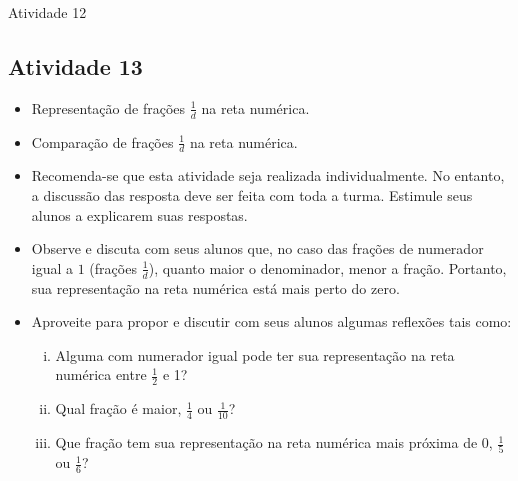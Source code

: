 \begin{multicols}{2}
\begin{resposta*}{Atividade 12}


\end{resposta*}


\subsection{Atividade 13}


  \begin{itemize}
   \item Representação de frações $\frac{1}{d}$ na reta numérica.
   \item Comparação de frações $\frac{1}{d}$ na reta numérica.
  \end{itemize}
 

   \begin{itemize} 
    \item Recomenda-se que esta atividade seja realizada individualmente. No entanto, a discussão das resposta deve ser feita com toda a turma. Estimule seus alunos a explicarem suas respostas.
   \item  Observe e discuta com seus alunos que, no caso das frações de numerador igual a $1$ (frações $\frac{1}{d}$), quanto maior o denominador, menor a fração. Portanto, sua representação na reta numérica está mais perto do zero. 
   \item  Aproveite para propor e discutir com seus alunos algumas reflexões tais como: 
   \begin{enumerate}[(i)]
    \item Alguma com numerador igual pode ter sua representação na reta numérica entre $\frac{1}{2}$ e 1?
    \item Qual fração é maior, $\frac{1}{4}$ ou $\frac{1}{10}$?  
    \item Que fração tem sua representação na reta numérica mais próxima de 0, $\frac{1}{5}$ ou $\frac{1}{6}$?
   \end{enumerate}
 

\end{itemize}
\end{multicols}
